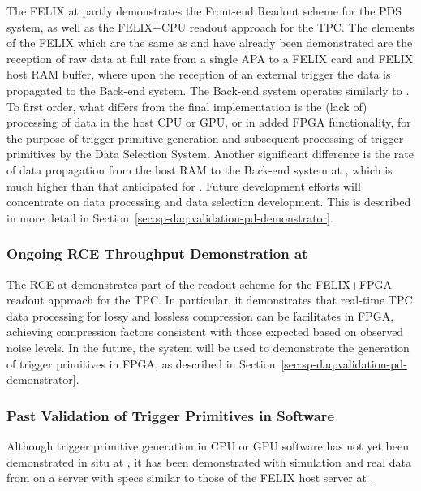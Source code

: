 The FELIX  at  partly demonstrates the Front-end Readout scheme for
the PDS system, as well as the FELIX+CPU readout approach for the
TPC. The elements of the  FELIX  which are the
same as  and have already been demonstrated are the
reception of raw data at full rate from a single APA to a 
FELIX card and FELIX host RAM buffer, where upon the reception of an external trigger the
data is propagated to the Back-end system. The Back-end system
operates similarly to . To first order, what differs from the final 
implementation is the (lack of) processing of data in the host CPU or
GPU, or in added FPGA functionality, for
the purpose of trigger primitive generation and subsequent processing
of trigger primitives by the Data Selection System. Another
significant difference is the rate of data propagation from the
host RAM to the Back-end system at , which is much higher
than that anticipated for . Future development
efforts will concentrate on data processing and data selection
development.  This is described in more detail in Section~\ref{sec:sp-daq:validation-pd-demonstrator}.

\subsubsection{Ongoing RCE Throughput Demonstration at }
\label{sec:sp-daq:validation-pdune-rce}

The RCE  at  demonstrates part of the readout scheme for
the FELIX+FPGA readout approach for the TPC. In particular, it
demonstrates that real-time TPC data processing for lossy
and lossless compression can be facilitates in FPGA, achieving
compression factors consistent with those expected based on observed
 noise levels. In the future, the system will be used
to demonstrate the generation of trigger primitives in FPGA, as
described in Section~\ref{sec:sp-daq:validation-pd-demonstrator}.

\subsubsection{Past Validation of Trigger Primitives in Software}
\label{sec:sp-daq:validation-software-trigger-primitives}

Although trigger primitive generation in CPU or GPU software has not
yet been demonstrated in situ at , it has been
demonstrated with simulation and real data from  on a
server with specs similar to those 
of the FELIX host server at .

